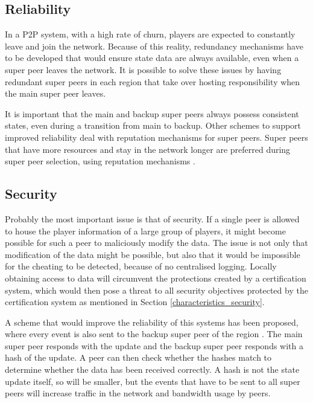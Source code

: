 \subsection{Reliability}
\label{super_peer_storage_reliability}

In a P2P system, with a high rate of churn, players are expected to constantly leave and join the network. Because of this reality, redundancy
mechanisms have to be developed that would ensure state data are always available, even when a super peer leaves the network. It is possible to solve
these issues by having redundant super peers in each region that take over hosting responsibility when the main super peer leaves.

It is important that the main and backup super peers always possess consistent states, even during a transition from main to backup. Other schemes to
support improved reliability deal with reputation mechanisms for super peers. Super peers that have more resources and stay in the network longer are
preferred during super peer selection, using reputation mechanisms \cite{fan_mediator_paper}.

\subsection{Security}

Probably the most important issue is that of security. If a single peer is allowed to house the player information of a large group of players, it
might become possible for such a peer to maliciously modify the data. The issue is not only that modification of the data might be possible, but also
that it would be impossible for the cheating to be detected, because of no centralised logging. Locally obtaining access to data will circumvent the
protections created by a certification system, which would then pose a threat to all security objectives protected by the certification system as
mentioned in Section \ref{characteristics_security}.

A scheme that would improve the reliability of this systems has been proposed, where every event is also sent to the backup super peer of the region
\cite{past_storage_focus}. The main super peer responds with the update and the backup super peer responds with a hash of the update. A peer can then
check whether the hashes match to determine whether the data has been received correctly. A hash is not the state update itself, so will be smaller,
but the events that have to be sent to all super peers will increase traffic in the network and bandwidth usage by peers.


